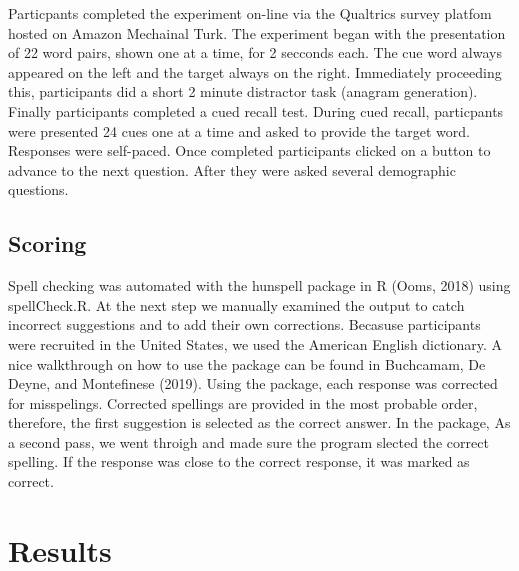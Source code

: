 \documentclass[pdf]{apa6}
\begin{document}
Particpants completed the experiment on-line via the Qualtrics survey platfom hosted on Amazon Mechainal Turk. The experiment began with the presentation of 22 word pairs, shown one at a time, for 2 secconds each. The cue word always appeared on the left and the target always on the right. Immediately proceeding this, participants did a short 2 minute distractor task (anagram generation). Finally participants completed a cued recall test. During cued recall, particpants were presented 24 cues one at a time and asked to provide the target word. Responses were self-paced. Once completed participants clicked on a button to advance to the next question. After they were asked several demographic questions.

\hypertarget{scoring}{%
\subsection{Scoring}\label{scoring}}

Spell checking was automated with the hunspell package in R (Ooms, 2018) using spellCheck.R. At the next step we manually examined the output to catch incorrect suggestions and to add their own corrections. Becasuse participants were recruited in the United States, we used the American English dictionary. A nice walkthrough on how to use the package can be found in Buchcamam, De Deyne, and Montefinese (2019). Using the package, each response was corrected for misspelings. Corrected spellings are provided in the most probable order, therefore, the first suggestion is selected as the correct answer. In the package, As a second pass, we went throigh and made sure the program slected the correct spelling. If the response was close to the correct response, it was marked as correct.

\hypertarget{results}{%
\section{Results}\label{results}}
\end{document}

